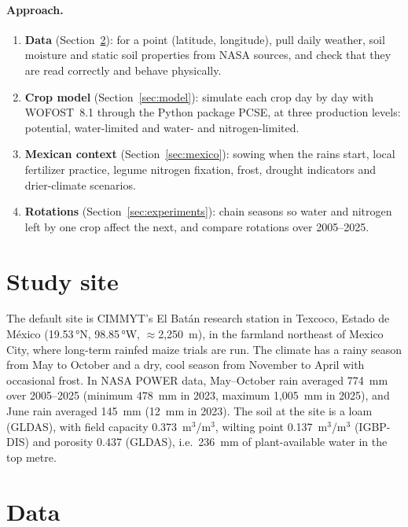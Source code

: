\documentclass[11pt,a4paper]{article}
\begin{document}
\paragraph{Approach.}
\begin{enumerate}[nosep]
  \item \textbf{Data} (Section~\ref{sec:data}): for a point (latitude, longitude), pull daily weather, soil moisture and
        static soil properties from NASA sources, and check that they are read correctly and behave physically.
  \item \textbf{Crop model} (Section~\ref{sec:model}): simulate each crop day by day with WOFOST~8.1 through the Python
        package PCSE, at three production levels: potential, water-limited and water- and nitrogen-limited.
  \item \textbf{Mexican context} (Section~\ref{sec:mexico}): sowing when the rains start, local fertilizer practice,
        legume nitrogen fixation, frost, drought indicators and drier-climate scenarios.
  \item \textbf{Rotations} (Section~\ref{sec:experiments}): chain seasons so water and nitrogen left by one crop affect
        the next, and compare rotations over 2005--2025.
\end{enumerate}

\section{Study site}\label{sec:site}

The default site is CIMMYT's El Batán research station in Texcoco, Estado de México (19.53\,°N, 98.85\,°W,
\(\approx\)2{,}250~m), in the farmland northeast of Mexico City, where long-term rainfed maize trials are run. The
climate has a rainy season from May to October and a dry, cool season from November to April with occasional frost.
In NASA POWER data, May--October rain averaged 774~mm over 2005--2025 (minimum 478~mm in 2023, maximum 1{,}005~mm in
2025), and June rain averaged 145~mm (12~mm in 2023). The soil at the site is a loam (GLDAS), with field capacity
0.373~m\(^3\)/m\(^3\), wilting point 0.137~m\(^3\)/m\(^3\) (IGBP-DIS) and porosity 0.437 (GLDAS), i.e.\ 236~mm of
plant-available water in the top metre.

\section{Data}\label{sec:data}
\end{document}
